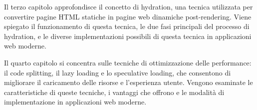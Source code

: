 Il terzo capitolo approfondisce il concetto di hydration, una tecnica utilizzata per convertire pagine HTML statiche in
pagine web dinamiche post-rendering. Viene spiegato il funzionamento di questa tecnica, le due fasi principali del processo di hydration, e le diverse implementazioni possibili di questa tecnica in applicazioni web moderne.

Il quarto capitolo si concentra sulle tecniche di ottimizzazione delle performance: il code splitting, il lazy
loading e lo speculative loading, che consentono di migliorare il caricamento delle risorse e l'esperienza utente.
Vengono esaminate le caratteristiche di queste tecniche, i vantaggi che offrono e le modalità di implementazione in
applicazioni web moderne.